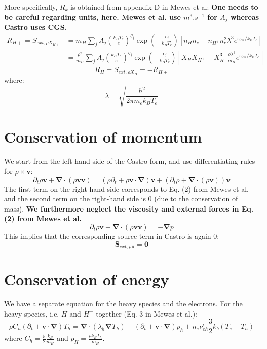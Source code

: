 \documentclass[11pt, oneside]{article}   	%
\begin{document}
More specifically, $R_k$ is obtained from appendix D in Mewes et al:
\textbf{One needs to be careful regarding units, here. Mewes et al. use $m^3.s^{-1}$ for $A_j$ whereas Castro uses CGS.}
\begin{align}
R_{H+} = S_{ext, \rho X_{H+} } &= m_H \sum_j A_j \left( \frac{k_BT_e}{e} \right)^{q_j}\exp\left( - \frac{\epsilon_j}{k_B T_e} \right)\left[ n_H n_e - n_{H^+}n_e^2 \lambda^3 e^{\epsilon_{ion}/k_BT_e} \right] \\
&= \frac{\rho^2}{m_H}\sum_j A_j \left( \frac{k_BT_e}{e} \right)^{q_j}\exp\left( - \frac{\epsilon_j}{k_B T_e} \right)\left[ X_H X_{H^+} - X_{H^+}^3 \frac{\rho \lambda^3}{m_H} e^{\epsilon_{ion}/k_BT_e} \right] 
\end{align}
\[ R_H = S_{ext, \rho X_{H} } = -R_{H+} \]
where: \[ \lambda = \sqrt{\frac{h^2}{2\pi m_e k_B T_e} } \]

\section{Conservation of momentum}

We start from the left-hand side of the Castro form, and use differentiating rules for $\rho \times \boldsymbol{v}$:
\[
\partial_t \rho \boldsymbol{v} + \boldsymbol{\nabla}\cdot(\rho \boldsymbol{v} \boldsymbol{v}) = (\rho\partial_t + \rho \boldsymbol{v}\cdot\boldsymbol{\nabla}) \boldsymbol{v} + (\partial_t \rho + \boldsymbol{\nabla}\cdot(\rho \boldsymbol{v} ) ) \boldsymbol{v}
\]
The first term on the right-hand side corresponds to Eq. (2) from Mewes et al. and the second term on the right-hand side is 0 (due to the conservation of mass). \textbf{We furthermore neglect the viscosity and external forces in Eq. (2) from Mewes et al.}
\[ \partial_t \rho \boldsymbol{v} + \boldsymbol{\nabla}\cdot(\rho \boldsymbol{v} \boldsymbol{v}) = -\boldsymbol{\nabla}p \]
This implies that the corresponding source term in Castro is again 0:
\[ \boldsymbol{S}_{ext,\rho\boldsymbol{u}} = \boldsymbol{0} \]

\section{Conservation of energy}

We have a separate equation for the heavy species and the electrons. For the heavy species, i.e. $H$ and $H^+$ together (Eq. 3 in Mewes et al.):
\[ \rho C_h (\partial_t + \boldsymbol{v}\cdot\boldsymbol{\nabla})T_h = \boldsymbol{\nabla}\cdot(\lambda_h\boldsymbol{\nabla}T_h) + (\partial_t + \boldsymbol{v}\cdot\boldsymbol{\nabla})p_h + n_e\nu_{eh}^\epsilon \frac{3}{2}k_b(T_e - T_h) \]
where $C_h = \frac{5}{2}\frac{k_B}{m_H}$ and $p_H = \frac{\rho k_B T_h}{m_H}$.
\end{document}
